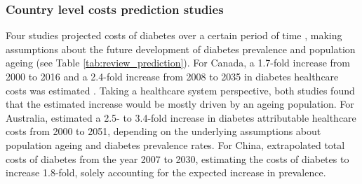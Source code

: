 \subsubsection{Country level costs prediction studies}
Four studies projected costs of diabetes over a certain period of time \parencite{Ohinmaa2004,Lau2011a,Davis2006b,Wang2009f}, making assumptions about the future development of diabetes prevalence and population ageing (see Table \ref{tab:review_prediction}). For Canada, a 1.7-fold increase from 2000 to 2016 \parencite{Ohinmaa2004} and a 2.4-fold increase from 2008 to 2035 in diabetes healthcare costs was estimated \parencite{Lau2011a}. Taking a healthcare system perspective, both studies found that the estimated increase would be mostly driven by an ageing population. For Australia, \textcite{Davis2006b} estimated a 2.5- to 3.4-fold increase in diabetes attributable healthcare costs from 2000 to 2051, depending on the underlying assumptions about population ageing and diabetes prevalence rates. For China, \textcite{Wang2009f} extrapolated total costs of diabetes from the year 2007 to 2030, estimating the costs of diabetes to increase 1.8-fold, solely accounting for the expected increase in prevalence.

